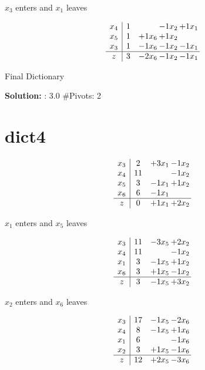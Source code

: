 \documentclass[10pt]{article}
\begin{document}
 $ x_{3} $ enters and $ x_{1} $ leaves 

 \[\begin{array}{c| c c@{\hskip 2pt} c@{\hskip 2pt} c@{\hskip 2pt} }
 x_{4}   &  1  &   & -1  x_{2} & + 1  x_{1}\\
 x_{5}   &  1 & + 1  x_{6} & + 1  x_{2} &   \\
 x_{3}   &  1 & -1  x_{6} & -1  x_{2} & -1  x_{1}\\
\hline
z    &  3 & -2  x_{6} & -1  x_{2} & -1  x_{1}\\
\end{array}\]


 Final Dictionary
\par \noindent\textbf{Solution:} :  3.0
\#Pivots:  2
\section{dict4}

\[\begin{array}{c| c c@{\hskip 2pt} c@{\hskip 2pt} }
 x_{3}   &  2 & + 3  x_{1} & -1  x_{2}\\
 x_{4}   &  11  &   & -1  x_{2}\\
 x_{5}   &  3 & -1  x_{1} & + 1  x_{2}\\
 x_{6}   &  6 & -1  x_{1} &   \\
\hline
z    &  0 & + 1  x_{1} & + 2  x_{2}\\
\end{array}\]


 $ x_{1} $ enters and $ x_{5} $ leaves 

 \[\begin{array}{c| c c@{\hskip 2pt} c@{\hskip 2pt} }
 x_{3}   &  11 & -3  x_{5} & + 2  x_{2}\\
 x_{4}   &  11  &   & -1  x_{2}\\
 x_{1}   &  3 & -1  x_{5} & + 1  x_{2}\\
 x_{6}   &  3 & + 1  x_{5} & -1  x_{2}\\
\hline
z    &  3 & -1  x_{5} & + 3  x_{2}\\
\end{array}\]


 $ x_{2} $ enters and $ x_{6} $ leaves 

 \[\begin{array}{c| c c@{\hskip 2pt} c@{\hskip 2pt} }
 x_{3}   &  17 & -1  x_{5} & -2  x_{6}\\
 x_{4}   &  8 & -1  x_{5} & + 1  x_{6}\\
 x_{1}   &  6  &   & -1  x_{6}\\
 x_{2}   &  3 & + 1  x_{5} & -1  x_{6}\\
\hline
z    &  12 & + 2  x_{5} & -3  x_{6}\\
\end{array}\]
\end{document}
